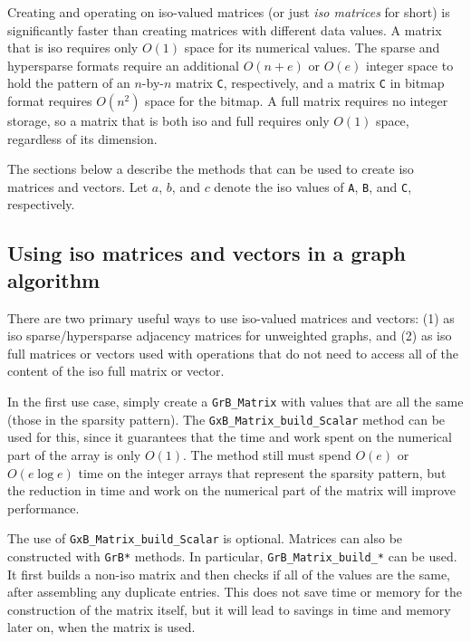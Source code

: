 \documentclass[12pt]{article}
\begin{document}
Creating and operating on iso-valued matrices (or just {\em iso matrices} for 
short) is significantly faster than creating matrices with different data
values.  A matrix that is iso requires only $O(1)$ space for its numerical
values.  The sparse and hypersparse formats require an additional $O(n+e)$ or
$O(e)$ integer space to hold the pattern of an $n$-by-$n$ matrix \verb'C',
respectively, and a matrix \verb'C' in bitmap format requires $O(n^2)$ space
for the bitmap.  A full matrix requires no integer storage, so a matrix that is
both iso and full requires only $O(1)$ space, regardless of its dimension.

The sections below a describe the methods that can be used to create iso
matrices and vectors.  Let $a$, $b$, and $c$ denote the iso values of \verb'A',
\verb'B', and \verb'C', respectively.

\subsection{Using iso matrices and vectors in a graph algorithm}
\label{iso_usage}

There are two primary useful ways to use iso-valued matrices and vectors: (1)
as iso sparse/hypersparse adjacency matrices for unweighted graphs, and (2) as
iso full matrices or vectors used with operations that do not need to access
all of the content of the iso full matrix or vector.

In the first use case, simply create a \verb'GrB_Matrix' with values that are
all the same (those in the sparsity pattern).  The
\verb'GxB_Matrix_build_Scalar' method can be used for this, since it
guarantees that the time and work spent on the numerical part of the array
is only $O(1)$.  The method still must spend $O(e)$ or $O(e \log e)$ time
on the integer arrays that represent the sparsity pattern, but the reduction
in time and work on the numerical part of the matrix will improve performance.

The use of \verb'GxB_Matrix_build_Scalar' is optional.  Matrices can also be
constructed with \verb'GrB*' methods.  In particular, \verb'GrB_Matrix_build_*'
can be used.  It first builds a non-iso matrix and then checks if all of the
values are the same, after assembling any duplicate entries.  This does not
save time or memory for the construction of the matrix itself, but it will
lead to savings in time and memory later on, when the matrix is used.
\end{document}
